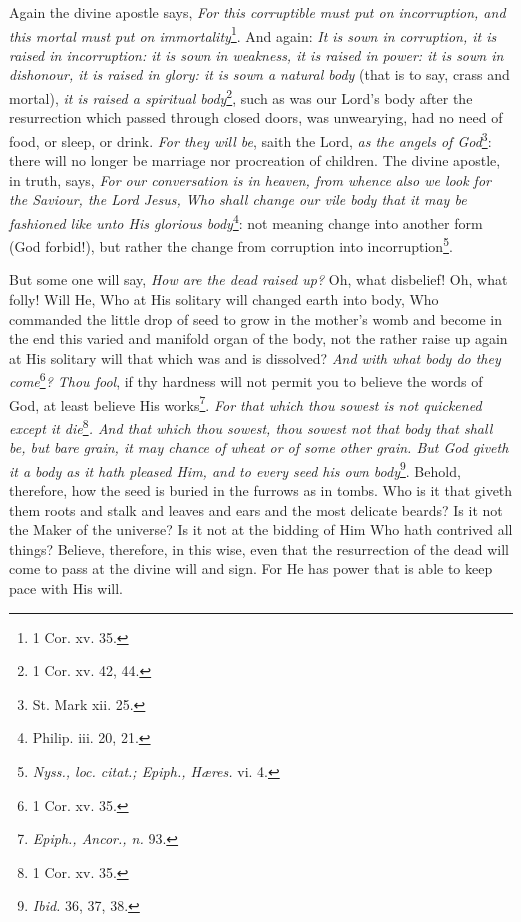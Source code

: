 Again the divine apostle says, \emph{For this corruptible must put on incorruption, and this mortal must put on immortality}\footnote{1 Cor. xv. 35.}. And again: \emph{It is sown in corruption, it is raised in incorruption: it is sown in weakness, it is raised in power: it is sown in dishonour, it is raised in glory: it is sown a natural body }(that is to say, crass and mortal), \emph{it is raised a spiritual body}\footnote{1 Cor. xv. 42, 44.}, such as was our Lord’s body after the resurrection which passed through closed doors, was unwearying, had no need of food, or sleep, or drink. \emph{For they will be}, saith the Lord, \emph{as the angels of God}\footnote{St. Mark xii. 25.}: there will no longer be marriage nor procreation of children. The divine apostle, in truth, says, \emph{For our conversation is in heaven, from whence }\emph{also we look for the Saviour, the Lord Jesus, Who shall change our vile body that it may be fashioned like unto His glorious body}\footnote{Philip. iii. 20, 21.}: not meaning change into another form (God forbid!), but rather the change from corruption into incorruption\footnote{\emph{Nyss., loc. citat.; Epiph., Hæres. }vi. 4.}.

But some one will say, \emph{How are the dead raised up? }Oh, what disbelief! Oh, what folly! Will He, Who at His solitary will changed earth into body, Who commanded the little drop of seed to grow in the mother’s womb and become in the end this varied and manifold organ of the body, not the rather raise up again at His solitary will that which was and is dissolved? \emph{And with what body do they come}\footnote{1 Cor. xv. 35.}\emph{? Thou fool}, if thy hardness will not permit you to believe the words of God, at least believe His works\footnote{\emph{Epiph., Ancor., n. }93.}. \emph{For that which thou sowest is not quickened except it die}\footnote{1 Cor. xv. 35.}\emph{. And that which thou sowest, thou sowest not that body that shall be, but bare grain, it may chance of wheat or of some other grain. But God giveth it a body as it hath pleased Him, and to every seed his own body}\footnote{\emph{Ibid. }36, 37, 38.}. Behold, therefore, how the seed is buried in the furrows as in tombs. Who is it that giveth them roots and stalk and leaves and ears and the most delicate beards? Is it not the Maker of the universe? Is it not at the bidding of Him Who hath contrived all things? Believe, therefore, in this wise, even that the resurrection of the dead will come to pass at the divine will and sign. For He has power that is able to keep pace with His will.

